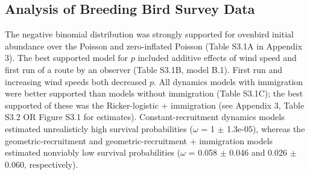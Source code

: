 \documentclass[12pt,english]{article}
\begin{document}
\begin{spacing}{1.9}
\begin{flushleft}
\subsection*{Analysis of Breeding Bird Survey Data}


The negative binomial distribution was strongly supported for ovenbird
initial abundance over the Poisson and zero-inflated Poisson
(Table S3.1A in Appendix 3). %
The best supported model for $p$ included additive effects of wind speed
and first run of a route by an observer (Table S3.1B, model B.1). First run 
and increasing wind speeds both decreased $p$. All dynamics models 
with immigration were better supported than models without immigration 
(Table S3.1C); the best supported of these was the Ricker-logistic + immigration 
(see Appendix 3, Table S3.2 OR Figure S3.1 for estimates).
Constant-recruitment dynamics models estimated unrealisticly high
survival probabilities ($\omega$ = 1 $\pm$ 1.3e-05), whereas %
the geometric-recruitment and geometric-recruitment + immigration
models estimated nonviably low survival probabilities %
($\omega$ =
0.058 $\pm$ 0.046 and 0.026 $\pm$ 0.060, respectively). 


\end{flushleft}
\end{spacing}
\end{document}
